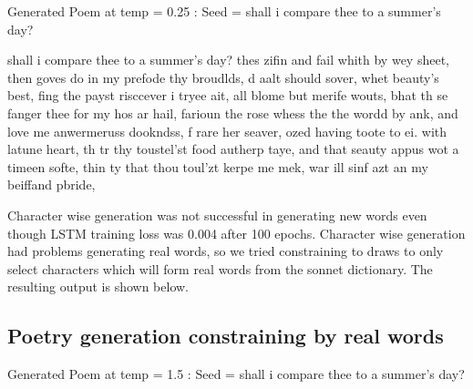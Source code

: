 \noindent Generated Poem at temp =  0.25 :\newline
Seed =  shall i compare thee to a summer's day?

\noindent shall i compare thee to a summer's day? \newline
thes zifin and fail whith by wey sheet, \newline
then goves do in my prefode thy broudlds, \newline
d aalt should sover, whet beauty's best, \newline
fing the payst risccever i tryee ait, \newline
all blome but merife wouts, \newline
bhat th se fanger thee for my hos ar hail, \newline
farioun the rose whess the the wordd by ank, \newline
and love me anwermeruss dookndss, \newline
f rare her seaver, ozed having toote to ei. \newline
  with latune heart, th tr thy toustel'st food autherp taye, \newline
and that seauty appus wot a timeen softe, \newline
  thin ty that thou toul'zt kerpe me mek, \newline
war ill sinf azt an my beiffand pbride, 

Character wise generation was not successful in generating new words even though LSTM training loss was 0.004 after 100 epochs. Character wise generation had problems generating real words, so we tried constraining to draws to only select characters which will form real words from the sonnet dictionary. The resulting output is shown below.

\subsection*{Poetry generation constraining by real words}

\noindent Generated Poem at temp =  1.5 :\newline
Seed =  shall i compare thee to a summer's day?

